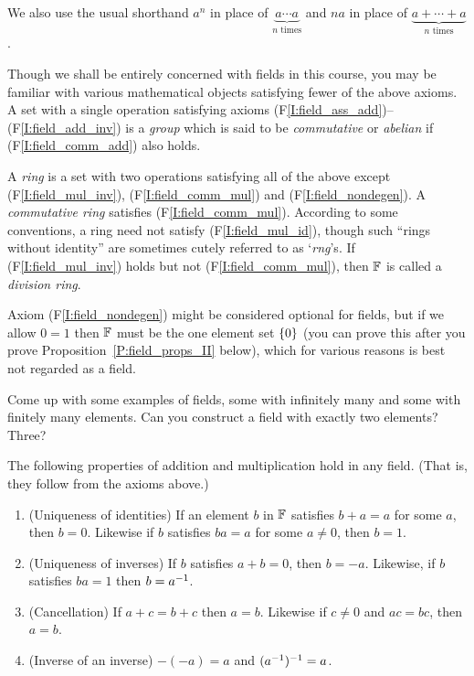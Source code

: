 \documentclass{book}
\begin{document}
\begin{defn}
We also use the usual shorthand $a^n$ in place of $\underbrace{a\cdots a}_\text{$n$ times}$ and $na$ in place of
$\underbrace{a + \cdots + a}_\text{$n$ times}$.
\label{D:field}
\end{defn}

\begin{rmk}
Though we shall be entirely concerned with fields in this course,
you may be familiar with various mathematical objects satisfying fewer 
of the above axioms. A set with a single operation satisfying axioms
(F\ref{I:field_ass_add})--(F\ref{I:field_add_inv}) is a {\em group} which is said
to be {\em commutative} or {\em abelian} if (F\ref{I:field_comm_add}) also holds.

A {\em ring} is a set with two operations satisfying all of the above
except (F\ref{I:field_mul_inv}), (F\ref{I:field_comm_mul}) and (F\ref{I:field_nondegen}). A {\em commutative ring} satisfies (F\ref{I:field_comm_mul}).
According to some conventions, a ring need not satisfy (F\ref{I:field_mul_id}), though such ``rings
without identity'' are sometimes cutely referred to as `{\em rng}'s. If (F\ref{I:field_mul_inv})
holds but not (F\ref{I:field_comm_mul}), then $\mathbb{F}$ is called a {\em division
ring}. 

Axiom (F\ref{I:field_nondegen}) might be considered optional for fields, but if we allow $0 = 1$ then $\mathbb{F}$
must be the one element set $\left\{ 0 \right\}$ (you can prove this after you prove
Proposition~\ref{P:field_props_II} below), which for various reasons is best
not regarded as a field.
\end{rmk}

\begin{ex}
Come up with some examples of fields, some with infinitely many and some with
finitely many elements. Can you construct a field with exactly two elements? Three?
\label{Ex:field_exs}
\end{ex}

\begin{prop}
The following properties of addition and multiplication hold in any field. (That is, they follow from the axioms above.)
\begin{enumerate}
\item (Uniqueness of identities) If an element $b$ in $\mathbb{F}$ satisfies $b + a = a$ for some $a$, then $b = 0$. Likewise
if $b$ satisfies $ba = a$ for some $a \neq 0$, then $b = 1$. 
\item (Uniqueness of inverses) If $b$ satisfies $a + b = 0$, then $b = -a$. Likewise, if $b$ satisfies $ba = 1$ then $b = a^{-1}$. 
\item (Cancellation) If $a + c = b + c$ then $a = b$. Likewise if $c \neq 0$ and $ac = bc$, then $a = b$.
\item (Inverse of an inverse) $-(-a) = a$ and $(a^{-1})^{-1} = a$.
\end{enumerate}
\label{P:field_props_I}
\end{prop}
\end{document}
